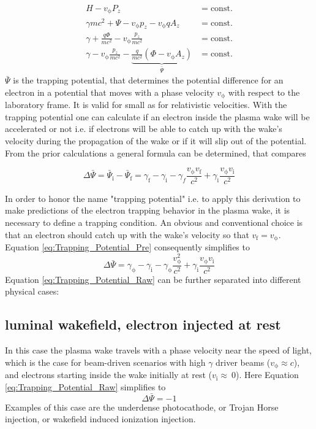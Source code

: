 \begin{align}
H-v_\mathrm{\phi}P_z &= \mathrm{const.}\\
\gamma m c^2+\Psi-v_\mathrm{\phi}p_z-v_\mathrm{\phi}qA_z &= \mathrm{const.}\\
\gamma+\frac{q \Phi}{m c^2}-v_\mathrm{\phi} \frac{p_z}{mc^2} &= \mathrm{const.}\\
\gamma - v_\mathrm{\phi} \frac{p_z}{mc^2}- \underbrace{\frac{q}{mc^2}(\Phi-v_\mathrm{\phi}A_z)}_{\bar{\Psi}}  &= \mathrm{const.} 
\end{align}
$\bar{\Psi}$ is the trapping potential, that determines the potential difference for an electron in a potential that moves with a phase velocity $v_\mathrm{\phi}$ with respect to the laboratory frame. It is valid for small as for relativistic velocities.
With the trapping potential one can calculate if an electron inside the plasma wake will be accelerated or not i.e. if electrons will be able to catch up with the wake's velocity during the propagation of the wake or if it will slip out of the potential.
From the prior calculations a general formula can be determined, that compares

\begin{equation}
\label{eq:Trapping_Potential_Pre}
\Delta \bar{\Psi}= \bar{\Psi}_\mathrm{i}-\bar{\Psi}_\mathrm{f}=\gamma_\mathrm{f}-\gamma_\mathrm{i}-\gamma_f\frac{v_\mathrm{\phi}v_\mathrm{f}}{c^2}+\gamma_\mathrm{i}\frac{v_\mathrm{\phi}v_\mathrm{i}}{c^2} 
\end{equation}

In order to honor the name "trapping potential" i.e. to apply this derivation to make predictions of the electron trapping behavior in the plasma wake, it is necessary to define a trapping condition. 
An obvious and conventional choice is that an electron should catch up with the wake's velocity so that 
$v_\mathrm{f}=v_\mathrm{\phi}$.
Equation \ref{eq:Trapping_Potential_Pre} consequently simplifies to 
\begin{equation}
\label{eq:Trapping_Potential_Raw}
\Delta \bar{\Psi}= \gamma_\mathrm{\phi}-\gamma_\mathrm{i}-\gamma_\mathrm{\phi}\frac{v_\mathrm{\phi}^2}{c^2}+\gamma_\mathrm{i}\frac{v_\mathrm{\phi}v_\mathrm{i}}{c^2} 
\end{equation}
Equation \ref{eq:Trapping_Potential_Raw} can be further separated into different physical cases:
\subsection*{luminal wakefield, electron injected  at rest}
In this case the plasma wake travels with a phase velocity near the speed of light, which is the case for beam-driven scenarios with high $\gamma$ driver beams ($v_\mathrm{\phi} \approx c$), and electrons starting inside the wake initially at rest ($v_\mathrm{i} \approx \ 0$).
Here Equation \ref{eq:Trapping_Potential_Raw} simplifies to
\begin{equation}
\Delta \bar{\Psi}=-1
\end{equation}
Examples of this case are the underdense photocathode, or Trojan Horse injection\cite{Hidding_PRL_2012}, or wakefield induced ionization injection\cite{MartinezdelaOssa2014231}.
